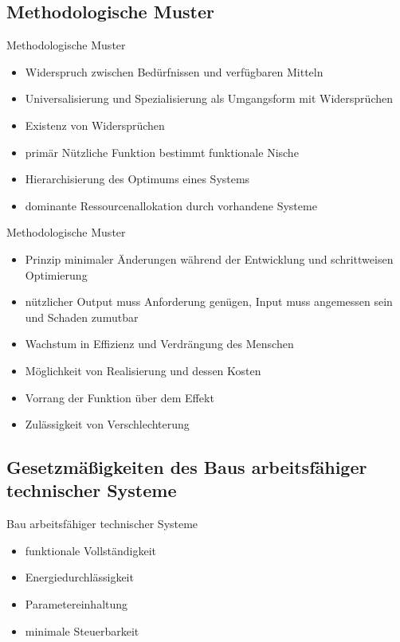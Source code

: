 \documentclass{beamer}
\begin{document}
\subsection{Methodologische Muster}
\begin{frame}{Methodologische Muster}
\begin{itemize}
\item Widerspruch zwischen Bedürfnissen und verfügbaren Mitteln
\item Universalisierung und Spezialisierung als Umgangsform mit Widersprüchen
\item Existenz von Widersprüchen
\item primär Nützliche Funktion bestimmt funktionale Nische
\item Hierarchisierung des Optimums eines Systems
\item dominante Ressourcenallokation durch vorhandene Systeme
\end{itemize}
\end{frame}
\begin{frame}{Methodologische Muster}
\begin{itemize}
\item Prinzip minimaler Änderungen während der Entwicklung und schrittweisen Optimierung
\item nützlicher Output muss Anforderung genügen, Input muss angemessen sein und Schaden zumutbar
\item Wachstum in Effizienz und Verdrängung des Menschen
\item Möglichkeit von Realisierung und dessen Kosten
\item Vorrang der Funktion über dem Effekt
\item Zulässigkeit von Verschlechterung
\end{itemize}
\end{frame}

\subsection{Gesetzmäßigkeiten des Baus arbeitsfähiger technischer Systeme}
\begin{frame}{Bau arbeitsfähiger technischer Systeme}
\begin{itemize}
\item funktionale Vollständigkeit
\item Energiedurchlässigkeit
\item Parametereinhaltung
\item minimale Steuerbarkeit
\end{itemize}
\end{frame}
\end{document}
